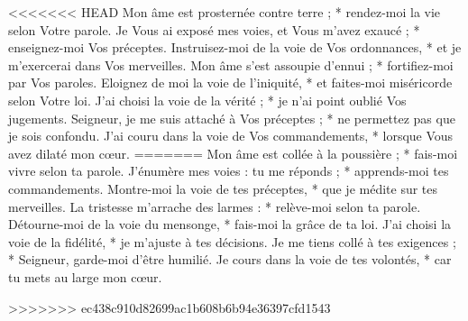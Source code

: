 <<<<<<< HEAD
Mon âme est prosternée contre terre ; * rendez-moi la vie selon Votre parole.
\versseparator
Je Vous ai exposé mes voies, et Vous m'avez exaucé ; * enseignez-moi Vos préceptes.
\versseparator
Instruisez-moi de la voie de Vos ordonnances, * et je m'exercerai dans Vos merveilles.
\versseparator
Mon âme s'est assoupie d'ennui ; * fortifiez-moi par Vos paroles.
\versseparator
Eloignez de moi la voie de l'iniquité, * et faites-moi miséricorde selon Votre loi.
\versseparator
J'ai choisi la voie de la vérité ; * je n'ai point oublié Vos jugements.
\versseparator
Seigneur, je me suis attaché à Vos préceptes ; * ne permettez pas que je sois confondu.
\versseparator
J'ai couru dans la voie de Vos commandements, * lorsque Vous avez dilaté mon cœur.
=======
Mon âme est collée à la poussière ; *
fais-moi vivre selon ta parole.
\versseparator
J’énumère mes voies : tu me réponds ; *
apprends-moi tes commandements.
\versseparator
Montre-moi la voie de tes préceptes, *
que je médite sur tes merveilles.
\versseparator
La tristesse m’arrache des larmes : *
relève-moi selon ta parole.
\versseparator
Détourne-moi de la voie du mensonge, *
fais-moi la grâce de ta loi.
\versseparator
J’ai choisi la voie de la fidélité, *
je m’ajuste à tes décisions.
\versseparator
Je me tiens collé à tes exigences ; *
Seigneur, garde-moi d’être humilié.
\versseparator
Je cours dans la voie de tes volontés, *
car tu mets au large mon cœur.

>>>>>>> ec438c910d82699ac1b608b6b94e36397cfd1543
